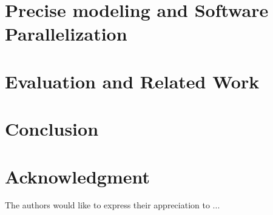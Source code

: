 \documentclass [a4paper,final,conference,10pt]{IDAACS}
\begin{document}
\section{Precise modeling and Software Parallelization}
\label{sec:impl}



\section{Evaluation and Related Work}
\label{sec:eval}

\section{Conclusion}
\label{sec:concl}

\section*{Acknowledgment}
The authors would like to express their appreciation to ...
\enlargethispage{-7in}



\end{document}
